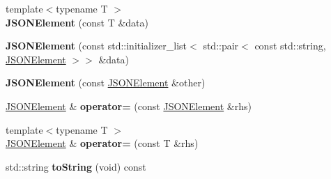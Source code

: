 \begin{DoxyCompactItemize}
\item 
\hypertarget{class_simple_j_s_o_n_1_1_j_s_o_n_element_ab64359a2a84641d8fb0dda26c67b0edb}{{\footnotesize template$<$typename T $>$ }\\{\bfseries J\+S\+O\+N\+Element} (const T \&data)}\label{class_simple_j_s_o_n_1_1_j_s_o_n_element_ab64359a2a84641d8fb0dda26c67b0edb}

\item 
\hypertarget{class_simple_j_s_o_n_1_1_j_s_o_n_element_a35a3c6d37faf9036c788cde9ecea9a1e}{{\bfseries J\+S\+O\+N\+Element} (const std\+::initializer\+\_\+list$<$ std\+::pair$<$ const std\+::string, \hyperlink{class_simple_j_s_o_n_1_1_j_s_o_n_element}{J\+S\+O\+N\+Element} $>$$>$ \&data)}\label{class_simple_j_s_o_n_1_1_j_s_o_n_element_a35a3c6d37faf9036c788cde9ecea9a1e}

\item 
\hypertarget{class_simple_j_s_o_n_1_1_j_s_o_n_element_a84b0a17c4d745cd51ac1ecccc00fd8c5}{{\bfseries J\+S\+O\+N\+Element} (const \hyperlink{class_simple_j_s_o_n_1_1_j_s_o_n_element}{J\+S\+O\+N\+Element} \&other)}\label{class_simple_j_s_o_n_1_1_j_s_o_n_element_a84b0a17c4d745cd51ac1ecccc00fd8c5}

\item 
\hypertarget{class_simple_j_s_o_n_1_1_j_s_o_n_element_aa802f573e155c7ca8d208880f3891dc5}{\hyperlink{class_simple_j_s_o_n_1_1_j_s_o_n_element}{J\+S\+O\+N\+Element} \& {\bfseries operator=} (const \hyperlink{class_simple_j_s_o_n_1_1_j_s_o_n_element}{J\+S\+O\+N\+Element} \&rhs)}\label{class_simple_j_s_o_n_1_1_j_s_o_n_element_aa802f573e155c7ca8d208880f3891dc5}

\item 
\hypertarget{class_simple_j_s_o_n_1_1_j_s_o_n_element_ac76f86322bba79ec08e649c8c6304c8f}{{\footnotesize template$<$typename T $>$ }\\\hyperlink{class_simple_j_s_o_n_1_1_j_s_o_n_element}{J\+S\+O\+N\+Element} \& {\bfseries operator=} (const T \&rhs)}\label{class_simple_j_s_o_n_1_1_j_s_o_n_element_ac76f86322bba79ec08e649c8c6304c8f}

\item 
\hypertarget{class_simple_j_s_o_n_1_1_j_s_o_n_element_ab7e6a3fcfc053f52cd9aff631047b960}{std\+::string {\bfseries to\+String} (void) const }\label{class_simple_j_s_o_n_1_1_j_s_o_n_element_ab7e6a3fcfc053f52cd9aff631047b960}


\end{DoxyCompactItemize}
